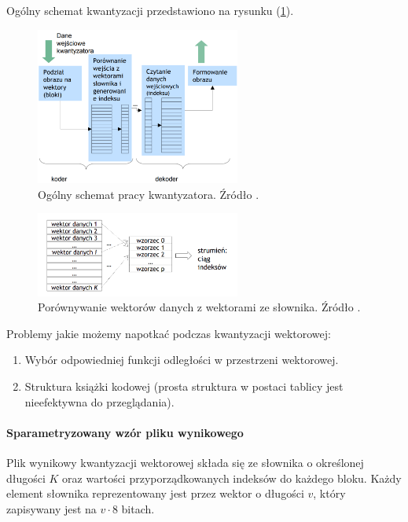 \documentclass{article}
\begin{document}
Ogólny schemat kwantyzacji przedstawiono na rysunku (\ref{fig:schemat_kwantyzatora}).

\begin{figure}[h]
  \centering
  \includegraphics[width=0.6\textwidth]{images/schemat_kwantyzatora.png}
  \caption{Ogólny schemat pracy kwantyzatora. Źródło \cite{mwilczewski}.}
  \label{fig:schemat_kwantyzatora}
\end{figure}

\begin{figure}[h]
  \centering
  \includegraphics[width=0.6\textwidth]{images/wektory_danych.png}
  \caption{Porównywanie wektorów danych z wektorami ze słownika. Źródło \cite{mwilczewski}.}
  \label{fig:wektory_danych}
\end{figure}

Problemy jakie możemy napotkać podczas kwantyzacji wektorowej:
\begin{enumerate}
  \item Wybór odpowiedniej funkcji odległości w przestrzeni wektorowej.
  \item Struktura książki kodowej (prosta struktura w postaci tablicy jest nieefektywna do przeglądania).
\end{enumerate}

\paragraph{Sparametryzowany wzór pliku wynikowego}
\label{sec:lgb_file_size}
Plik wynikowy kwantyzacji wektorowej składa się ze słownika o określonej długości $K$ oraz wartości przyporządkowanych indeksów do każdego bloku. Każdy element słownika reprezentowany jest przez wektor o długości $v$, który zapisywany jest na $v \cdot 8$ bitach.
\end{document}
